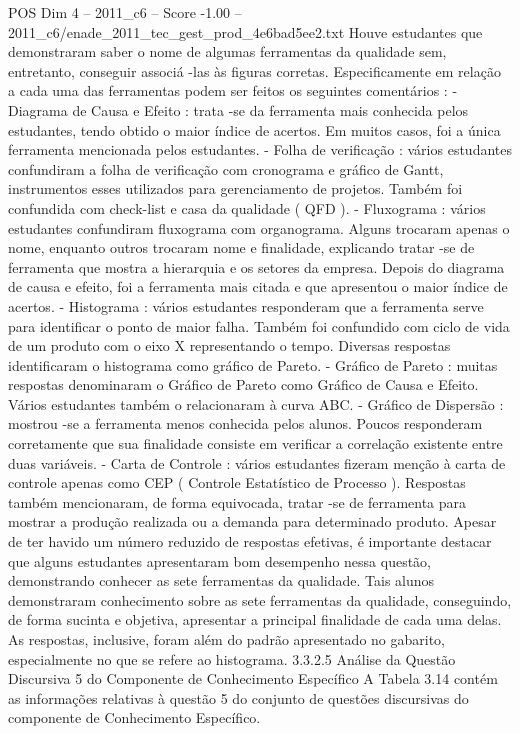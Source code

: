 \begin{textsample}{POS Dim 4 – 2011\_c6 – Score -1.00 – 2011\_c6/enade\_2011\_tec\_gest\_prod\_4e6bad5ee2.txt}
Houve estudantes que demonstraram saber o nome de algumas ferramentas da qualidade sem, entretanto, conseguir associá -las às figuras corretas.
Especificamente em relação a cada uma das ferramentas podem ser feitos os seguintes comentários : - Diagrama de Causa e Efeito : trata -se da ferramenta mais conhecida pelos estudantes, tendo obtido o maior índice de acertos.
Em muitos casos, foi a única ferramenta mencionada pelos estudantes. - Folha de verificação : vários estudantes confundiram a folha de verificação com cronograma e gráfico de Gantt, instrumentos esses utilizados para gerenciamento de projetos.
Também foi confundida com check-list e casa da qualidade ( QFD ). - Fluxograma : vários estudantes confundiram fluxograma com organograma.
Alguns trocaram apenas o nome, enquanto outros trocaram nome e finalidade, explicando tratar -se de ferramenta que mostra a hierarquia e os setores da empresa.
Depois do diagrama de causa e efeito, foi a ferramenta mais citada e que apresentou o maior índice de acertos. - Histograma : vários estudantes responderam que a ferramenta serve para identificar o ponto de maior falha.
Também foi confundido com ciclo de vida de um produto com o eixo X representando o tempo.
Diversas respostas identificaram o histograma como gráfico de Pareto. - Gráfico de Pareto : muitas respostas denominaram o Gráfico de Pareto como Gráfico de Causa e Efeito.
Vários estudantes também o relacionaram à curva ABC. - Gráfico de Dispersão : mostrou -se a ferramenta menos conhecida pelos alunos.
Poucos responderam corretamente que sua finalidade consiste em verificar a correlação existente entre duas variáveis. - Carta de Controle : vários estudantes fizeram menção à carta de controle apenas como CEP ( Controle Estatístico de Processo ).
Respostas também mencionaram, de forma equivocada, tratar -se de ferramenta para mostrar a produção realizada ou a demanda para determinado produto.
Apesar de ter havido um número reduzido de respostas efetivas, é importante destacar que alguns estudantes apresentaram bom desempenho nessa questão, demonstrando conhecer as sete ferramentas da qualidade.
Tais alunos demonstraram conhecimento sobre as sete ferramentas da qualidade, conseguindo, de forma sucinta e objetiva, apresentar a principal finalidade de cada uma delas.
As respostas, inclusive, foram além do padrão apresentado no gabarito, especialmente no que se refere ao histograma. 3.3.2.5 Análise da Questão Discursiva 5 do Componente de Conhecimento Específico A Tabela 3.14 contém as informações relativas à questão 5 do conjunto de questões discursivas do componente de Conhecimento Específico.

\end{textsample}

